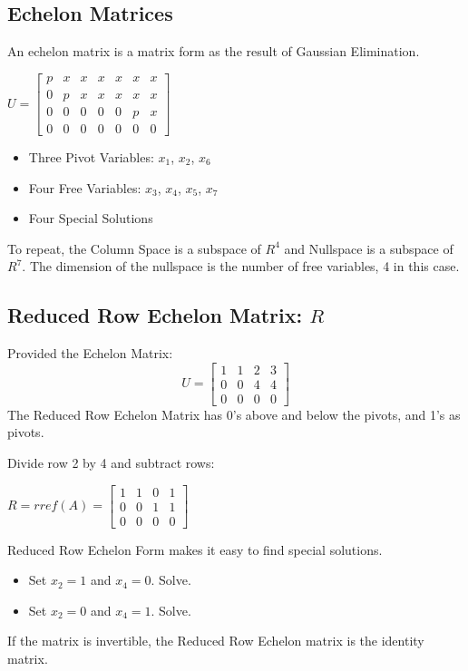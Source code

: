 \documentclass[10pt,a4paper]{article}
\begin{document}
\subsection{Echelon Matrices}
An echelon matrix is a matrix form as the result of Gaussian Elimination.
\begin{center}
		$U=\begin{bmatrix} 
			p&x&x&x&x&x&x \\ 
			0&p&x&x&x&x&x \\
			0&0&0&0&0&p&x \\
			0&0&0&0&0&0&0
		\end{bmatrix}$ 
		\begin{itemize}
			\item Three Pivot Variables: $x_1$, $x_2$, $x_6$
			\item Four Free Variables: $x_3$, $x_4$, $x_5$, $x_7$
			\item Four Special Solutions
		\end{itemize}
\end{center}
To repeat, the Column Space is a subspace of $R^4$ and Nullspace is a subspace of $R^7$. The
dimension of the nullspace is the number of free variables, 4 in this case.

\subsection{Reduced Row Echelon Matrix: $R$}
Provided the Echelon Matrix: 
$$U=\begin{bmatrix}
	1&1&2&3 \\
	0&0&4&4 \\
	0&0&0&0
\end{bmatrix}$$
The Reduced Row Echelon Matrix has 0's above and below the pivots, and 1's as pivots.
\begin{center}
	Divide row 2 by 4 and subtract rows: \par $R=rref(A)=\begin{bmatrix}
		1&1&0&1 \\
		0&0&1&1 \\
		0&0&0&0
	\end{bmatrix}$
\end{center}
Reduced Row Echelon Form makes it easy to find special solutions.
\begin{itemize}
	\item Set $x_2=1$ and $x_4=0$. Solve.
	\item Set $x_2=0$ and $x_4=1$. Solve.
\end{itemize}
\begin{tcolorbox}[breakable,colback=white,colframe=black,width=\dimexpr\textwidth+12mm\relax,enlarge left by=-6mm]
If the matrix is invertible, the Reduced Row Echelon matrix is the identity matrix. 
\end{tcolorbox}
\pagebreak
\end{document}
